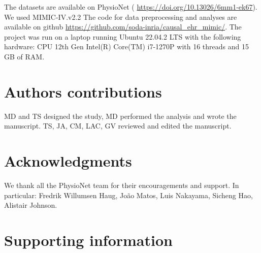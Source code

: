 \documentclass[10pt,letterpaper]{article}
\begin{document}
The datasets are available on PhysioNet (
\url{https://doi.org/10.13026/6mm1-ek67}). We used MIMIC-IV.v2.2 The code for
data preprocessing and analyses are available on github
\url{https://github.com/soda-inria/causal_ehr_mimic/}.
The project was run on a laptop running Ubuntu 22.04.2 LTS with the following hardware: CPU 12th Gen Intel(R) Core(TM) i7-1270P with 16 threads and 15 GB of RAM.


\section*{Authors contributions}

MD and TS designed the study, MD performed the analysis and wrote the manuscript.
TS, JA, CM, LAC, GV reviewed and edited the manuscript.

\section*{Acknowledgments}

We thank all the PhysioNet team for their encouragements and support. In
particular: Fredrik Willumsen Haug, João Matos, Luis Nakayama, Sicheng Hao, Alistair Johnson.

\nolinenumbers



\clearpage

\section*{Supporting information}

\end{document}
